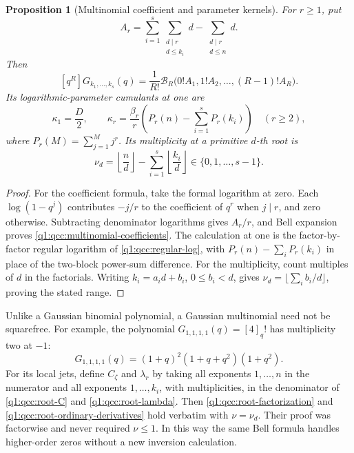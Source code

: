 \documentclass[11pt,a4paper,oneside,openany]{book}
\newtheorem{proposition}[theorem]{Proposition}
\theoremstyle{definition}
\theoremstyle{remark}
\newcommand{\Y}[1]{\mathcal B_{#1}}
\begin{document}
\begin{proposition}[Multinomial coefficient and parameter kernels]
\label{q1:qcc:multinomial-kernels}
For \(r\ge1\), put
\[
 A_r=\sum_{i=1}^{s}\sum_{\substack{d\mid r\\d\le k_i}}d
           -\sum_{\substack{d\mid r\\d\le n}}d.
\]
Then
\begin{equation}\label{q1:qcc:multinomial-coefficients}
 [q^R]G_{k_1,\ldots,k_s}(q)
   =\frac1{R!}\Y R\bigl(0!A_1,1!A_2,\ldots,(R-1)!A_R\bigr).
\end{equation}
Its logarithmic-parameter cumulants at one are
\begin{equation}\label{q1:qcc:multinomial-cumulants}
 \kappa_1=\frac D2,\qquad
 \kappa_r=\frac{\beta_r}{r}
       \left(P_r(n)-\sum_{i=1}^{s}P_r(k_i)\right)\quad(r\ge2),
\end{equation}
where \(P_r(M)=\sum_{j=1}^{M}j^r\). Its multiplicity at a primitive
\(d\)-th root is
\begin{equation}\label{q1:qcc:multinomial-carry}
 \nu_d=\left\lfloor\frac nd\right\rfloor
            -\sum_{i=1}^{s}\left\lfloor\frac{k_i}{d}\right\rfloor
          \in\{0,1,\ldots,s-1\}.
\end{equation}
\end{proposition}
\begin{proof}
For the coefficient formula, take the formal logarithm at zero. Each
\(\log(1-q^j)\) contributes \(-j/r\) to the coefficient of \(q^r\)
when \(j\mid r\), and zero otherwise. Subtracting denominator
logarithms gives \(A_r/r\), and Bell expansion proves
\eqref{q1:qcc:multinomial-coefficients}. The calculation at one is the
factor-by-factor regular logarithm of \cref{q1:qcc:regular-log}, with
\(P_r(n)-\sum_iP_r(k_i)\) in place of the two-block power-sum difference.
For the multiplicity, count multiples of \(d\) in the factorials.
Writing \(k_i=a_id+b_i\), \(0\le b_i<d\), gives
\(\nu_d=\lfloor\sum_i b_i/d\rfloor\), proving the stated range.
\end{proof}

Unlike a Gaussian binomial polynomial, a Gaussian multinomial need not be
squarefree. For example, the polynomial \(G_{1,1,1,1}(q)=[4]_q!\) has multiplicity
two at \(-1\):
\begin{equation}\label{q1:qcc:multinomial-repeat-example}
 G_{1,1,1,1}(q)=(1+q)^2(1+q+q^2)(1+q^2).
\end{equation}
For its local jets, define \(C_\zeta\) and \(\lambda_r\) by taking
all exponents \(1,\ldots,n\) in the numerator and all exponents
\(1,\ldots,k_i\), with multiplicities, in the denominator of
\eqref{q1:qcc:root-C} and \eqref{q1:qcc:root-lambda}. Then
\eqref{q1:qcc:root-factorization} and
\eqref{q1:qcc:root-ordinary-derivatives} hold verbatim with
\(\nu=\nu_d\). Their proof was factorwise and never required
\(\nu\le1\). In this way the same Bell formula handles higher-order zeros
without a new inversion calculation.
\end{document}
